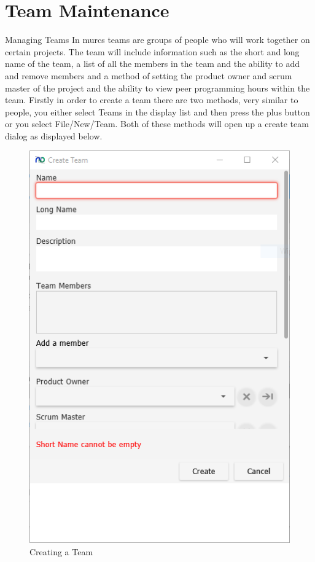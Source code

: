 \section{Team Maintenance}

Managing Teams
\newline\newline
In murcs teams are groups of people who will work together on certain projects. The team will include information such as the short and long name of the team, a list of all the members in the team and the ability to add and remove members and a method of setting the product owner and scrum master of the project and the ability to view peer programming hours within the team.
\newline
Firstly in order to create a team there are two methods, very similar to people, you either select Teams in the display list and then press the plus button or you select File/New/Team. Both of these methods will open up a create team dialog as displayed below.

\begin{figure}[H]
\centering
\includegraphics[width=\textwidth]{images/screenshots/teams1.PNG}
\caption{Creating a Team}
\label{fig:new_project}
\end{figure}

